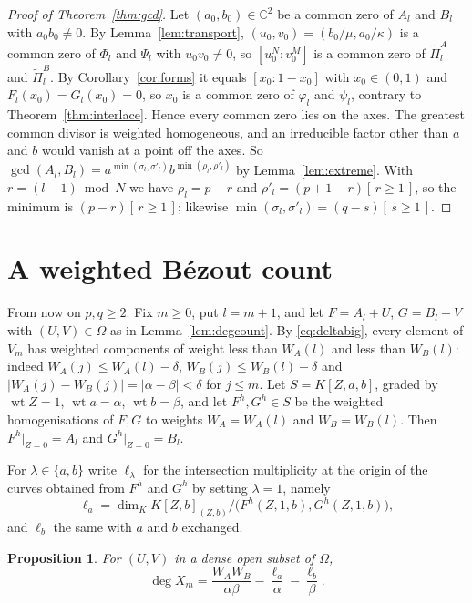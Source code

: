 \documentclass[11pt]{amsart}
\newtheorem{proposition}[theorem]{Proposition}
\theoremstyle{definition}
\theoremstyle{remark}
\numberwithin{equation}{section}
\newcommand{\C}{\mathbb{C}}
\newcommand{\ind}[1]{[\,#1\,]}
\DeclareMathOperator{\wt}{wt}
\begin{document}
\begin{proof}[Proof of Theorem~\ref{thm:gcd}]
Let $(a_0,b_0)\in\C^2$ be a common zero of $A_l$ and $B_l$ with $a_0b_0\ne0$. By Lemma~\ref{lem:transport}, $(u_0,v_0)=(b_0/\mu,a_0/\kappa)$ is a common zero of $\Phi_l$ and $\Psi_l$ with $u_0v_0\ne0$, so $[u_0^N:v_0^M]$ is a common zero of $\tilde\Pi^A_l$ and $\tilde\Pi^B_l$. By Corollary~\ref{cor:forms} it equals $[x_0:1-x_0]$ with $x_0\in(0,1)$ and $F_l(x_0)=G_l(x_0)=0$, so $x_0$ is a common zero of $\varphi_l$ and $\psi_l$, contrary to Theorem~\ref{thm:interlace}. Hence every common zero lies on the axes. The greatest common divisor is weighted homogeneous, and an irreducible factor other than $a$ and $b$ would vanish at a point off the axes. So $\gcd(A_l,B_l)=a^{\min(\sigma_l,\sigma'_l)}b^{\min(\rho_l,\rho'_l)}$ by Lemma~\ref{lem:extreme}. With $r=(l-1)\bmod N$ we have $\rho_l=p-r$ and $\rho'_l=(p+1-r)\ind{r\ge1}$, so the minimum is $(p-r)\ind{r\ge1}$; likewise $\min(\sigma_l,\sigma'_l)=(q-s)\ind{s\ge1}$.
\end{proof}

\section{A weighted B\'ezout count}\label{sec:bezout}

From now on $p,q\ge2$. Fix $m\ge0$, put $l=m+1$, and let $F=A_l+U$, $G=B_l+V$ with $(U,V)\in\Omega$ as in Lemma~\ref{lem:degcount}. By \eqref{eq:deltabig}, every element of $V_m$ has weighted components of weight less than $W_A(l)$ and less than $W_B(l)$: indeed $W_A(j)\le W_A(l)-\delta$, $W_B(j)\le W_B(l)-\delta$ and $|W_A(j)-W_B(j)|=|\alpha-\beta|<\delta$ for $j\le m$. Let $S=K[Z,a,b]$, graded by $\wt Z=1$, $\wt a=\alpha$, $\wt b=\beta$, and let $F^h,G^h\in S$ be the weighted homogenisations of $F,G$ to weights $W_A=W_A(l)$ and $W_B=W_B(l)$. Then $F^h|_{Z=0}=A_l$ and $G^h|_{Z=0}=B_l$.

For $\lambda\in\{a,b\}$ write $\ell_\lambda$ for the intersection multiplicity at the origin of the curves obtained from $F^h$ and $G^h$ by setting $\lambda=1$, namely
\[
\ell_a=\dim_K K[Z,b]_{(Z,b)}\big/\bigl(F^h(Z,1,b),G^h(Z,1,b)\bigr),
\]
and $\ell_b$ the same with $a$ and $b$ exchanged.

\begin{proposition}\label{prop:bezout}
For $(U,V)$ in a dense open subset of $\Omega$,
\[
\deg X_m=\frac{W_AW_B}{\alpha\beta}-\frac{\ell_a}{\alpha}-\frac{\ell_b}{\beta}.
\]
\end{proposition}
\end{document}
